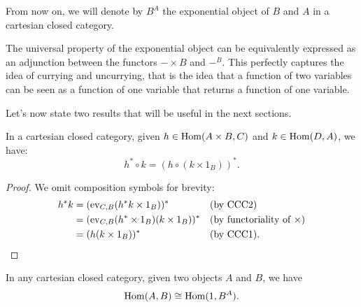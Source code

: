 \begin{notation}\label{idx:exponential}
    From now on, we will denote by $B^A$ the exponential object of $B$ and $A$ in a cartesian closed category.
\end{notation}

\begin{remark}
    The universal property of the exponential object can be equivalently expressed as an adjunction between the functors $- \times B$ and $-^B$. This
    perfectly captures the idea of currying and uncurrying, that is the idea that a function of two variables can be seen as a function of one variable that returns a function of one variable.
\end{remark}

Let's now state two results that will be useful in the next sections.

\begin{proposition}\label{prop:distributivity-of-currying}
    In a cartesian closed category, given $h \in \operatorname{Hom}(A \times B, C)$ and $k \in \operatorname{Hom}(D, A)$, we have:
    \[ h^* \circ k = (h \circ (k \times 1_B))^*. \]
\end{proposition}

\begin{proof}
    We omit composition symbols for brevity:
    \begin{align*}
        h^* k &= (\operatorname{ev}_{C,B} (h^*k \times 1_B))^* &&(\textnormal{by CCC2}) \\
              &= (\operatorname{ev}_{C,B} (h^* \times 1_B) (k \times 1_B))^* &&(\textnormal{by functoriality of $\times$}) \\
              &= (h (k \times 1_B))^* &&(\textnormal{by CCC1}).
    \end{align*}
\end{proof}

\begin{proposition}\label{prop:morphisms-as-global-elements}
    In any cartesian closed category, given two objects $A$ and $B$, we have
    \[ \operatorname{Hom}(A,B) \cong \operatorname{Hom}(1, B^A). \]
\end{proposition}

